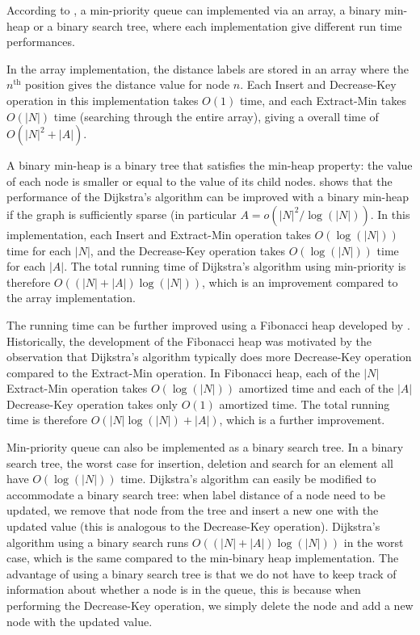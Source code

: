 According to \citet{Cormen},
a min-priority queue can implemented via an array, a binary min-heap or a binary search tree,
where each implementation give different run time performances.

In the array implementation,
the distance labels are stored in an array where the $n^{\text{th}}$ position gives the distance value for node $n$.
Each Insert and Decrease-Key operation in this implementation takes $O(1)$ time, and each Extract-Min takes $O(|N|)$ time (searching through the entire array), giving a overall time of $O(|N|^2 + |A|)$.

A binary min-heap is a binary tree that satisfies the min-heap property:
the value of each node is smaller or equal to the value of its child nodes.
\citet{Cormen} shows that the performance of the Dijkstra's algorithm can be improved with a binary min-heap if the graph is sufficiently sparse (in particular $A = o(|N|^2/\log(|N|))$.
In this implementation, each Insert and Extract-Min operation takes $O(\log(|N|))$ time for each $|N|$,
and the Decrease-Key operation takes $O(\log(|N|))$ time for each $|A|$.
The total running time of Dijkstra's algorithm using min-priority is therefore $O((|N|+|A|)\log(|N|))$,
which is an improvement compared to the array implementation.

The running time can be further improved using a Fibonacci heap developed by \citet{Fredman}.
Historically, the development of the Fibonacci heap was motivated by the observation that Dijkstra's algorithm typically does more Decrease-Key operation compared to the Extract-Min operation.
In Fibonacci heap, each of the $|N|$ Extract-Min operation takes $O(\log(|N|))$ amortized time
and each of the $|A|$ Decrease-Key operation takes only $O(1)$ amortized time.
The total running time is therefore $O(|N| \log(|N|)+|A|)$,
which is a further improvement.

Min-priority queue can also be implemented as a binary search tree.
In a binary search tree, the worst case for insertion, deletion and search for an element all have $O(\log(|N|))$ time.
Dijkstra's algorithm can easily be modified to accommodate a binary search tree:
when label distance of a node need to be updated,
we remove that node from the tree and insert a new one with the updated value (this is analogous to the Decrease-Key operation).
Dijkstra's algorithm using a binary search runs $O((|N|+|A|)\log(|N|))$ in the worst case, which is the same compared to the min-binary heap implementation.
The advantage of using a binary search tree is that we do not have to keep track of information about whether a node is in the queue,
this is because when performing the Decrease-Key operation,
we simply delete the node and add a new node with the updated value.


